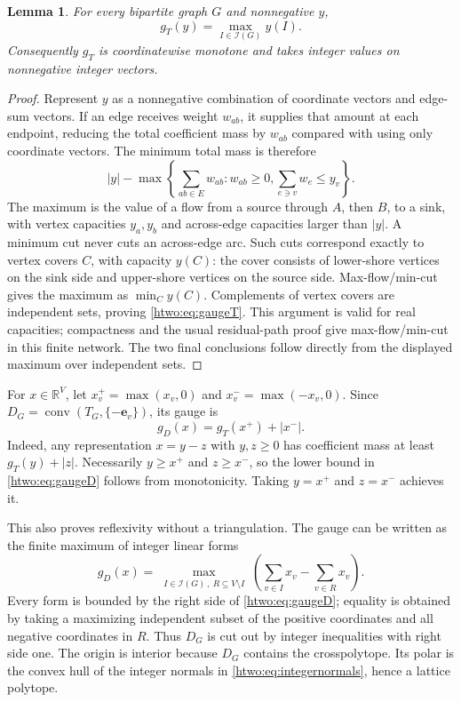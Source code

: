 \documentclass[11pt]{article}
\numberwithin{equation}{section}
\newtheorem{lemma}[theorem]{Lemma}
\theoremstyle{definition}
\newcommand{\R}{\mathbb R}
\newcommand{\conv}{\operatorname{conv}}
\newcommand{\ee}{\mathbf e}
\begin{document}
\begin{lemma}\label{htwo:lem:gaugeT}
For every bipartite graph $G$ and nonnegative $y$,
\begin{equation}
 g_T(y)=\max_{I\in\mathcal I(G)}y(I).
 \label{htwo:eq:gaugeT}
\end{equation}
Consequently $g_T$ is coordinatewise monotone and takes integer values on
nonnegative integer vectors.
\end{lemma}
\begin{proof}
Represent $y$ as a nonnegative combination of coordinate vectors and
edge-sum vectors. If an edge receives weight $w_{ab}$, it supplies that
amount at each endpoint, reducing the total coefficient mass by
$w_{ab}$ compared with using only coordinate vectors. The minimum total
mass is therefore
\[
 |y|-\max\left\{\sum_{ab\in E}w_{ab}:w_{ab}\ge0,
                   \sum_{e\ni v}w_e\le y_v\right\}.
\]
The maximum is the value of a flow from a source through $A$, then $B$,
to a sink, with vertex capacities $y_a,y_b$ and across-edge capacities
larger than $|y|$. A minimum cut never cuts an across-edge arc. Such cuts
correspond exactly to vertex covers $C$, with capacity $y(C)$: the cover
consists of lower-shore vertices on the sink side and upper-shore vertices
on the source side. Max-flow/min-cut gives the maximum as
$\min_C y(C)$. Complements of vertex covers are independent sets, proving
\eqref{htwo:eq:gaugeT}. This argument is valid for real capacities; compactness
and the usual residual-path proof give max-flow/min-cut in this finite
network. The two final conclusions follow directly from the displayed
maximum over independent sets.
\end{proof}

For $x\in\R^V$, let $x_v^+=\max(x_v,0)$ and
$x_v^-=\max(-x_v,0)$. Since $D_G=\conv(T_G,\{-\ee_v\})$, its gauge is
\begin{equation}
 g_D(x)=g_T(x^+)+|x^-|.
 \label{htwo:eq:gaugeD}
\end{equation}
Indeed, any representation $x=y-z$ with $y,z\ge0$ has coefficient mass at
least $g_T(y)+|z|$. Necessarily $y\ge x^+$ and $z\ge x^-$, so the lower
bound in \eqref{htwo:eq:gaugeD} follows from monotonicity. Taking $y=x^+$ and
$z=x^-$ achieves it.

This also proves reflexivity without a triangulation. The gauge can be
written as the finite maximum of integer linear forms
\begin{equation}
 g_D(x)=\max_{\substack{I\in\mathcal I(G)\,,\ R\subseteq V\setminus I}}
          \left(\sum_{v\in I}x_v-\sum_{v\in R}x_v\right).
 \label{htwo:eq:integernormals}
\end{equation}
Every form is bounded by the right side of \eqref{htwo:eq:gaugeD}; equality is
obtained by taking a maximizing independent subset of the positive
coordinates and all negative coordinates in $R$. Thus $D_G$ is cut out
by integer inequalities with right side one. The origin is interior
because $D_G$ contains the crosspolytope. Its polar is the convex hull of
the integer normals in \eqref{htwo:eq:integernormals}, hence a lattice polytope.
\end{document}
